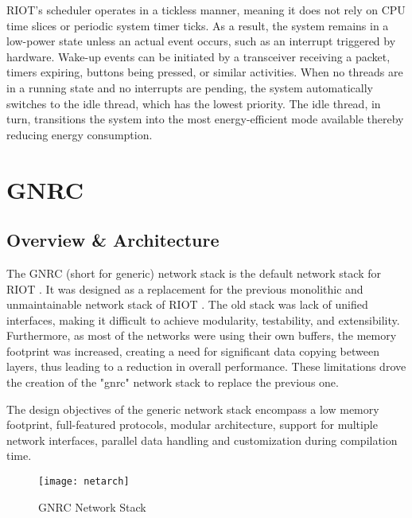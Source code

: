    RIOT's scheduler operates in a tickless manner, meaning it does not rely on CPU time slices 
    or periodic system timer ticks. As a result, the system remains in a low-power state unless 
    an actual event occurs, such as an interrupt triggered by hardware. Wake-up events can be 
    initiated by a transceiver receiving a packet, timers expiring, buttons being pressed, or 
    similar activities. When no threads are in a running state and no interrupts are pending, 
    the system automatically switches to the idle thread, which has the lowest priority. 
    The idle thread, in turn, transitions the system into the most energy-efficient mode available 
    thereby reducing energy consumption.
\section{GNRC}
\subsection{Overview \& Architecture}
  The GNRC (short for generic) network stack is the default network stack for RIOT \cite{gnrc}. It was designed
  as a replacement for the previous monolithic and unmaintainable network stack of RIOT \cite{tcp}.
  The old stack was lack of unified interfaces, making it difficult to achieve modularity, testability,
  and extensibility. Furthermore, as most of the networks were using their own buffers, the memory
  footprint was increased, creating a need for significant data copying between layers, thus leading
  to a reduction in overall performance. These limitations drove the creation of the "gnrc" network stack 
  to replace the previous one.

  The design objectives of the generic network stack encompass a low memory footprint, full-featured
  protocols, modular architecture, support for multiple network interfaces, parallel data handling
  and customization during compilation time.

  \begin{figure}[h]
    \centering
    \texttt{[image: netarch]}
    \caption{GNRC Network Stack}
    \label{fig:netarch}
  \end{figure}

